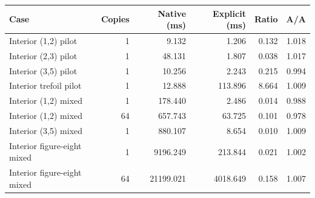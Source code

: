 \begin{center}
\small
\begin{tabular}{lrrrrr}
\toprule
Case & Copies & Native (ms) & Explicit (ms) & Ratio & A/A \\
\midrule
Interior (1,2) pilot & 1 & 9.132 & 1.206 & 0.132 & 1.018 \\
Interior (2,3) pilot & 1 & 48.131 & 1.807 & 0.038 & 1.017 \\
Interior (3,5) pilot & 1 & 10.256 & 2.243 & 0.215 & 0.994 \\
Interior trefoil pilot & 1 & 12.888 & 113.896 & 8.664 & 1.009 \\
Interior (1,2) mixed & 1 & 178.440 & 2.486 & 0.014 & 0.988 \\
Interior (1,2) mixed & 64 & 657.743 & 63.725 & 0.101 & 0.978 \\
Interior (3,5) mixed & 1 & 880.107 & 8.654 & 0.010 & 1.009 \\
Interior figure-eight mixed & 1 & 9196.249 & 213.844 & 0.021 & 1.002 \\
Interior figure-eight mixed & 64 & 21199.021 & 4018.649 & 0.158 & 1.007 \\
\bottomrule
\end{tabular}
\end{center}

